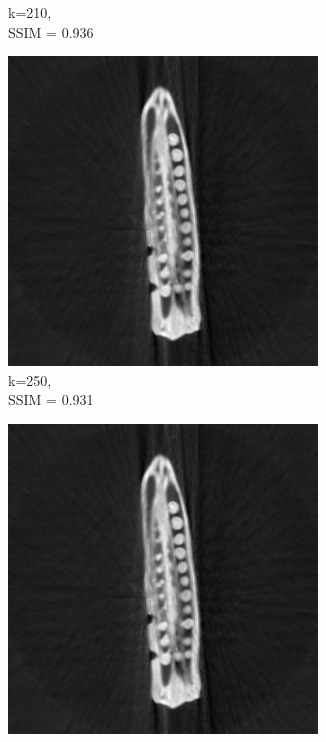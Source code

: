 \documentclass[journal]{IEEEtran}
\begin{document}
\begin{figure}[h]
\begin{subfigure}[b]{0.24\linewidth}
        \caption{k=210,\\ SSIM = 0.936}
     \end{subfigure}
   \begin{subfigure}[b]{0.24\linewidth}
        \includegraphics[width=\textwidth]{../images/okra/2D_okra/weighted_pca250.png}
        \caption{k=250,\\ SSIM = 0.931}
     \end{subfigure}
   \begin{subfigure}[b]{0.24\linewidth}
        \includegraphics[width=\textwidth]{../images/okra/2D_okra/weighted_pca290.png}

\end{subfigure}
\end{figure}
\end{document}
